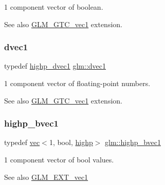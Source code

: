 1 component vector of boolean. \begin{DoxySeeAlso}{See also}
\hyperlink{group__gtc__vec1}{G\+L\+M\+\_\+\+G\+T\+C\+\_\+vec1} extension. 
\end{DoxySeeAlso}
\mbox{\label{group__ext__vec1_ga8d5252eec287cf34cc18a219a118f9f2}} 
\subsubsection{\texorpdfstring{dvec1}{dvec1}}
{\footnotesize\ttfamily typedef \hyperlink{group__ext__vec1_ga51e54e6b2fe3962fc44a176eeb3e3fe6}{highp\+\_\+dvec1} \hyperlink{group__ext__vec1_ga8d5252eec287cf34cc18a219a118f9f2}{glm\+::dvec1}}

1 component vector of floating-\/point numbers. \begin{DoxySeeAlso}{See also}
\hyperlink{group__gtc__vec1}{G\+L\+M\+\_\+\+G\+T\+C\+\_\+vec1} extension. 
\end{DoxySeeAlso}
\mbox{\label{group__ext__vec1_gac7fdd0536d878f87393132b3a7f9ef03}} 
\subsubsection{\texorpdfstring{highp\+\_\+bvec1}{highp\_bvec1}}
{\footnotesize\ttfamily typedef \hyperlink{structglm_1_1vec}{vec}$<$1, bool, \hyperlink{namespaceglm_a36ed105b07c7746804d7fdc7cc90ff25ac6f7eab42eacbb10d59a58e95e362074}{highp}$>$ \hyperlink{group__ext__vec1_gac7fdd0536d878f87393132b3a7f9ef03}{glm\+::highp\+\_\+bvec1}}

1 component vector of bool values.

\begin{DoxySeeAlso}{See also}
\hyperlink{group__ext__vec1}{G\+L\+M\+\_\+\+E\+X\+T\+\_\+vec1} 
\end{DoxySeeAlso}
\mbox{\label{group__ext__vec1_ga51e54e6b2fe3962fc44a176eeb3e3fe6}} 
